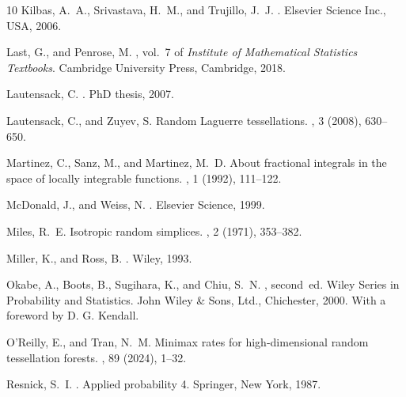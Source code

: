\documentclass[11pt,a4paper]{article}
\theoremstyle{plain}
\theoremstyle{definition}
\theoremstyle{remark}
\begin{document}
\begin{thebibliography}{10}
{\sc Kilbas, A.~A., Srivastava, H.~M., and Trujillo, J.~J.}
.
\newblock Elsevier Science Inc., USA, 2006.

{\sc Last, G., and Penrose, M.}
, vol.~7 of {\em Institute
    of Mathematical Statistics Textbooks}.
\newblock Cambridge University Press, Cambridge, 2018.

{\sc Lautensack, C.}
.
\newblock PhD thesis, 2007.

{\sc Lautensack, C., and Zuyev, S.}
\newblock Random {L}aguerre tessellations.
, 3 (2008), 630--650.

{\sc Martinez, C., Sanz, M., and Martinez, M.~D.}
\newblock About fractional integrals in the space of locally integrable
    functions.
, 1
    (1992), 111--122.

{\sc McDonald, J., and Weiss, N.}
.
\newblock Elsevier Science, 1999.

{\sc Miles, R.~E.}
\newblock Isotropic random simplices.
, 2 (1971), 353--382.

{\sc Miller, K., and Ross, B.}
.
\newblock Wiley, 1993.

{\sc Okabe, A., Boots, B., Sugihara, K., and Chiu, S.~N.}
, second~ed.
\newblock Wiley Series in Probability and Statistics. John Wiley \& Sons, Ltd.,
    Chichester, 2000.
\newblock With a foreword by D. G. Kendall.

{\sc O'Reilly, E., and Tran, N.~M.}
\newblock Minimax rates for high-dimensional random tessellation forests.
, 89 (2024), 1--32.

{\sc Resnick, S.~I.}
.
\newblock Applied probability 4. Springer, New York, 1987.


\end{thebibliography}
\end{document}
